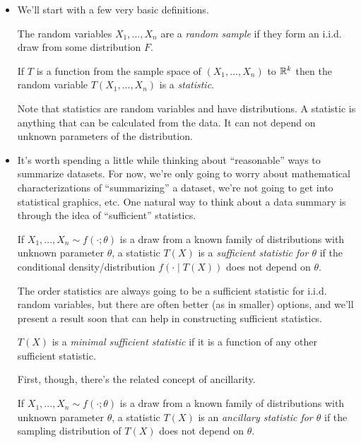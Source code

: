 \begin{itemize}

\item We'll start with a few very basic definitions.
  \begin{defn}
    The random variables $X_1,...,X_n$ are a \emph{random sample} if
    they form an i.i.d. draw from some distribution $F$.
  \end{defn}

  \begin{defn}
    If $T$ is a function from the sample space of $(X_1,...,X_n)$ to
    $\mathbb{R}^k$ then the random variable $T(X_1,...,X_n)$ is a
    \emph{statistic}.
  \end{defn}

  Note that statistics are random variables and have distributions.  A
  statistic is anything that can be calculated from the data.  It can
  not depend on unknown parameters of the distribution.

\item It's worth spending a little while thinking about ``reasonable''
  ways to summarize datasets.  For now, we're only going to worry
  about mathematical characterizations of ``summarizing'' a dataset,
  we're not going to get into statistical graphics, etc.  One natural
  way to think about a data summary is through the idea of
  ``sufficient'' statistics.

  \begin{defn}
    If $X_1,...,X_n \sim f(\cdot; \theta)$ is a draw from a known family of
    distributions with unknown parameter $\theta$, a statistic $T(X)$ is a
    \emph{sufficient statistic for $\theta$} if the conditional
    density/distribution $f(\cdot \mid T(X))$ does not depend on $\theta$.
  \end{defn}

  The order statistics are always going to be a sufficient statistic
  for i.i.d. random variables, but there are often better (as in
  smaller) options, and we'll present a result soon that can help in
  constructing sufficient statistics.

  \begin{defn}
    $T(X)$ is a \emph{minimal sufficient statistic} if it is a
    function of any other sufficient statistic.
  \end{defn}

  First, though, there's the related concept of ancillarity.

  \begin{defn}
    If $X_1,...,X_n \sim f(\cdot; \theta)$ is a draw from a known family of
    distributions with unknown parameter $\theta$, a statistic $T(X)$ is an
    \emph{ancillary statistic for $\theta$} if the sampling distribution of
    $T(X)$ does not depend on $\theta$.
  \end{defn}


\end{itemize}
